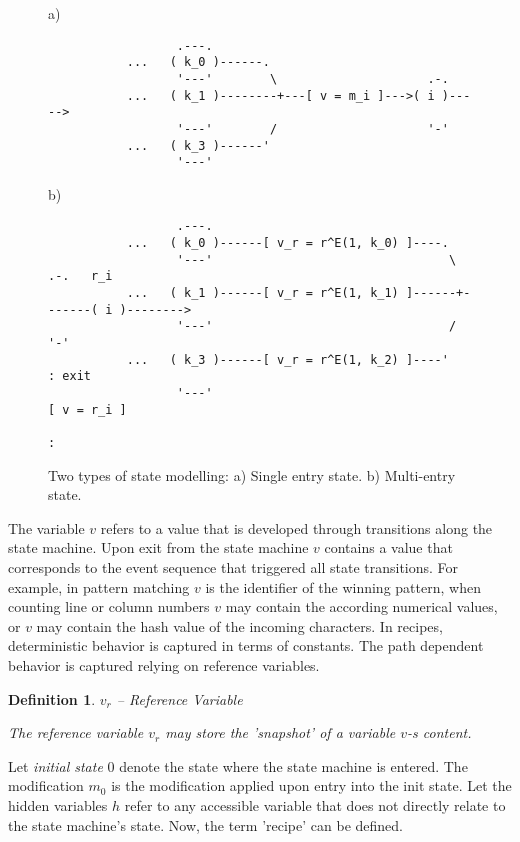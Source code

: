 \documentclass[12pt,a4paper]{scrartcl}
\newtheorem{definition}{Definition}
\begin{document}
\begin{figure}[htbp] \leavevmode \label{fig:se-vs-me}
a)

\begin{verbatim}
                  .---.  
           ...   ( k_0 )------.
                  '---'        \                     .-.
           ...   ( k_1 )--------+---[ v = m_i ]--->( i )----->   
                  '---'        /                     '-'
           ...   ( k_3 )------'       
                  '---'
\end{verbatim}
     
b)
     
\begin{verbatim}
                  .---.
           ...   ( k_0 )------[ v_r = r^E(1, k_0) ]----.
                  '---'                                 \         .-.   r_i
           ...   ( k_1 )------[ v_r = r^E(1, k_1) ]------+-------( i )-------->  
                  '---'                                 /         '-'
           ...   ( k_3 )------[ v_r = r^E(1, k_2) ]----'           : exit
                  '---'                                       [ v = r_i ]
                                                                   :
\end{verbatim}
\caption{Two types of state modelling: a) Single entry state. 
b) Multi-entry state.}
\end{figure}

The variable $v$ refers to a value that is developed through transitions along
the state machine. Upon exit from the state machine $v$ contains a value that
corresponds to the event sequence that triggered all state transitions. For
example, in pattern matching $v$ is the identifier of the winning pattern, when
counting line or column numbers $v$ may contain the according numerical values,
or $v$ may contain the hash value of the incoming characters. In recipes,
deterministic behavior is captured in terms of constants. The path dependent
behavior is captured relying on reference variables.

\begin{definition} $v_r$ -- Reference Variable

    The reference variable $v_r$ may store the 'snapshot' of a variable $v$-s
    content. 

\end{definition}

Let \textit{initial state} 0 denote the state where the state machine is entered.
The modification $m_0$ is the modification applied upon entry into the init state.
Let the hidden variables $h$ refer to any accessible variable that does not
directly relate to the state machine's state. Now, the term 'recipe' can 
be defined.
\end{document}
